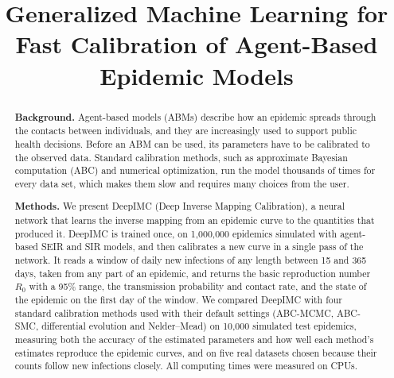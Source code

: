 \documentclass[12pt]{article}
\title{Generalized Machine Learning for Fast Calibration of Agent-Based Epidemic Models}
\date{}
\begin{document}
\maketitle

\begin{abstract}
\noindent\textbf{Background.}
Agent-based models (ABMs) describe how an epidemic spreads through the contacts between
individuals, and they are increasingly used to support public health decisions. Before an ABM can
be used, its parameters have to be calibrated to the observed data. Standard calibration methods,
such as approximate Bayesian computation (ABC) and numerical optimization, run the model thousands
of times for every data set, which makes them slow and requires many choices from the user.

\noindent\textbf{Methods.}
We present DeepIMC (Deep Inverse Mapping Calibration), a neural network that learns the inverse
mapping from an epidemic curve to the quantities that produced it. DeepIMC is trained once, on
1,000,000 epidemics simulated with agent-based SEIR and SIR models, and then calibrates a new
curve in a single pass of the network. It reads a window of daily new infections of any length
between 15 and 365 days, taken from any part of an epidemic, and returns the basic reproduction
number $R_0$ with a 95\% range, the transmission probability and contact rate, and the state of
the epidemic on the first day of the window. We compared DeepIMC with four standard calibration
methods used with their default settings (ABC-MCMC, ABC-SMC, differential evolution and
Nelder--Mead) on 10,000 simulated test epidemics, measuring both the accuracy of the estimated
parameters and how well each method's estimates reproduce the epidemic curves, and on five real
datasets chosen because their counts follow new infections closely. All computing times were
measured on CPUs.


\end{abstract}
\end{document}
